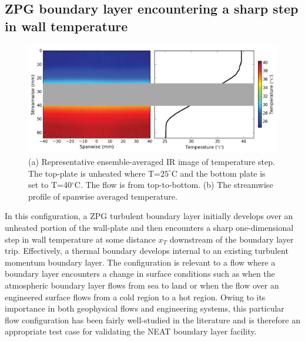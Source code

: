 %


\subsection{ZPG boundary layer encountering a sharp step in wall temperature}
\begin{figure}[h!]
\centering
\includegraphics[scale=.5]{figures/facility/therm_step_IR_v6.png}
\caption{(a) Representative ensemble-averaged IR image of temperature step. The top-plate is unheated where T=$25^\circ$C and the bottom plate is set to T=40$^\circ$C. The flow is from top-to-bottom. (b) The streamwise profile of spanwise averaged temperature.} 
\label{fig:IR-STEP}
\end{figure}

In this configuration, a ZPG turbulent boundary layer initially develops over an unheated portion of the wall-plate and then encounters a sharp one-dimensional step in wall temperature at some distance $x_T$ downstream of the boundary layer trip. Effectively, a thermal boundary develops internal to an existing turbulent momentum boundary layer. The configuration is relevant to a flow where a boundary layer encounters a change in surface conditions such as when the atmospheric boundary layer flows from sea to land or when the flow over an engineered surface flows from a cold region to a hot region.  Owing to its importance in both geophysical flows and engineering systems, this particular flow configuration has been fairly well-studied in the literature \cite{Antonia1977,Hoffmann1979, Moretti1965} and is therefore an appropriate test case for validating the NEAT boundary layer facility. 

